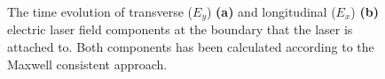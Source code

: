 \begin{figure}[h!]
	\centering
	\hspace{2mm}
	\caption{The time evolution of transverse ($ E_{y} $) \textbf{(a)} and longitudinal ($ E_{x} $) \textbf{(b)} electric laser field components at the boundary that the laser is attached to. Both components has been calculated according to the Maxwell consistent approach.}
	\label{fig:3}
\end{figure}

